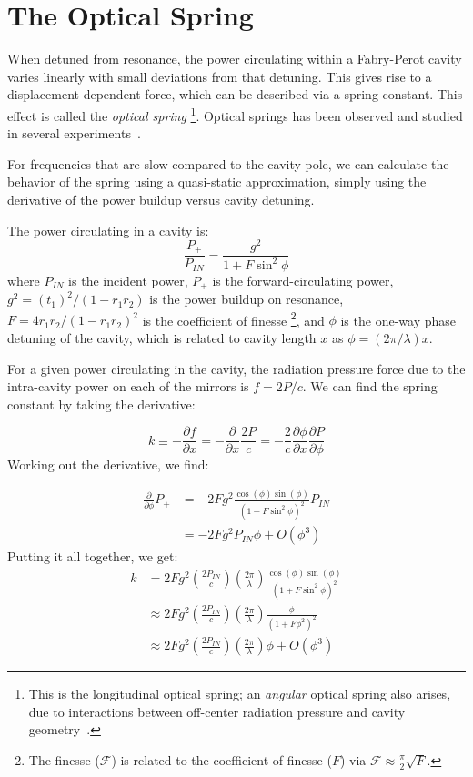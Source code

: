 \chapter{The Optical Spring}
When detuned from resonance, the power circulating within a Fabry-Perot
cavity varies linearly with small deviations from that detuning. This
gives rise to a displacement-dependent force, which can be described
via a spring constant. This effect is called the \emph{optical spring}
\footnote{This is the longitudinal optical spring; an \emph{angular} optical spring
also arises, due to interactions between off-center radiation pressure and cavity geometry~\cite{Sidles2006Optical}.}.  Optical springs has been observed and studied in several experiments~\cite{Sheard2004Observation}.

For frequencies that are slow compared to the cavity pole, we can
calculate the behavior of the spring using a quasi-static approximation,
simply using the derivative of the power buildup versus cavity detuning.

The power circulating in a cavity is:
\begin{equation}
\frac{P_{+}}{P_{IN}}=\frac{g^{2}}{1+F\sin^{2}\phi}
\end{equation}
where $P_{IN}$ is the incident power, $P_{+}$ is the forward-circulating
power, $g^{2}=\left(t_{1}\right)^{2}/\left(1-r_{1}r_{2}\right)$ is
the power buildup on resonance, $F=4r_{1}r_{2}/\left(1-r_{1}r_{2}\right)^{2}$
is the coefficient of finesse%
\footnote{The finesse ($\mathcal{F}$) is related to the coefficient of finesse
($F$) via $\mathcal{F}\approx\frac{\pi}{2}\sqrt{F}$.%
}, and $\phi$ is the one-way phase detuning of the cavity, which is
related to cavity length $x$ as $\phi=(2\pi/\lambda)x$. 

For a given power circulating in the cavity, the radiation pressure
force due to the intra-cavity power on each of the mirrors is $f=2P/c$.
We can find the spring constant by taking the derivative:

\[
k\equiv-\frac{\partial f}{\partial x}=-\frac{\partial}{\partial x}\frac{2P}{c}=-\frac{2}{c}\frac{\partial\phi}{\partial x}\frac{\partial P}{\partial\phi}
\]
Working out the derivative, we find:

\begin{align}
\frac{\partial}{\partial\phi}P_{+} & =-2Fg^{2}\frac{\cos(\phi)\sin(\phi)}{\left(1+F\sin^{2}\phi\right)^{2}}P_{IN}\\
 & =-2Fg^{2}P_{IN}\phi+O\left(\phi^{3}\right)
\end{align}
Putting it all together, we get:
\begin{align}
k & =2Fg^{2}\left(\frac{2P_{IN}}{c}\right)\left(\frac{2\pi}{\lambda}\right)\frac{\cos(\phi)\sin(\phi)}{\left(1+F\sin^{2}\phi\right)^{2}}\label{eq:spring-constant}\\
 & \approx2Fg^{2}\left(\frac{2P_{IN}}{c}\right)\left(\frac{2\pi}{\lambda}\right)\frac{\phi}{\left(1+F\phi^{2}\right)^{2}}\label{eq:spring-constant-approx1}\\
 & \approx2Fg^{2}\left(\frac{2P_{IN}}{c}\right)\left(\frac{2\pi}{\lambda}\right)\phi+O\left(\phi^{3}\right)
\end{align}


